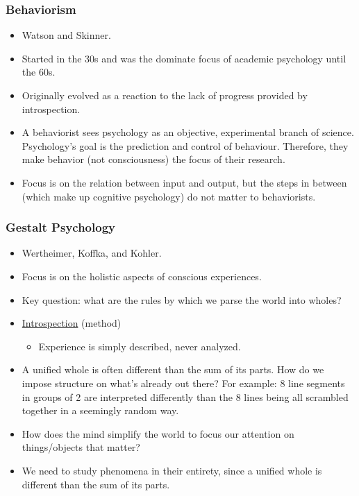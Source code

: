 \documentclass[]{article}
\begin{document}
			\subsubsection{Behaviorism}
				\begin{itemize}
					\item Watson and Skinner.
					\item Started in the 30s and was the dominate focus of academic psychology until the 60s.
					\item Originally evolved as a reaction to the lack of progress provided by introspection.
					\item A behaviorist sees psychology as an objective, experimental branch of science. Psychology's goal is the prediction and control of behaviour. Therefore, they make behavior (not consciousness) the focus of their research.
					\item Focus is on the relation between input and output, but the steps in between (which make up cognitive psychology) do not matter to behaviorists.
				\end{itemize}
				
			\subsubsection{Gestalt Psychology}
				\begin{itemize}
					\item Wertheimer, Koffka, and Kohler.
					\item Focus is on the holistic aspects of conscious experiences.
					\item Key question: what are the rules by which we parse the world into wholes?
					\item \underline{Introspection} (method)
						\begin{itemize}
							\item Experience is simply described, never analyzed.
						\end{itemize}
					\item A unified whole is often different than the sum of its parts. How do we impose structure on what's already out there? For example: 8 line segments in groups of 2 are interpreted differently than the 8 lines being all scrambled together in a seemingly random way.
					\item How does the mind simplify the world to focus our attention on things/objects that matter?
					\item We need to study phenomena in their entirety, since a unified whole is different than the sum of its parts.
				\end{itemize}
			
\end{document}
